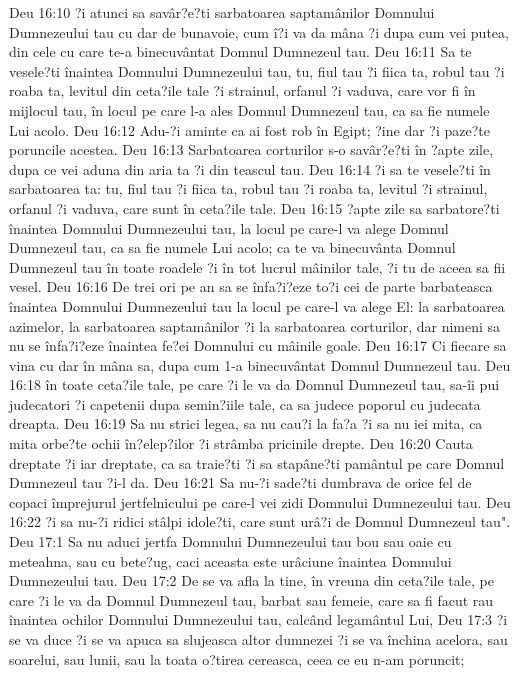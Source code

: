 Deu 16:10  ?i atunci sa savâr?e?ti sarbatoarea saptamânilor Domnului Dumnezeului tau cu dar de bunavoie, cum î?i va da mâna ?i dupa cum vei putea, din cele cu care te-a binecuvântat Domnul Dumnezeul tau.
Deu 16:11  Sa te vesele?ti înaintea Domnului Dumnezeului tau, tu, fiul tau ?i fiica ta, robul tau ?i roaba ta, levitul din ceta?ile tale ?i strainul, orfanul ?i vaduva, care vor fi în mijlocul tau, în locul pe care l-a ales Domnul Dumnezeul tau, ca sa fie numele Lui acolo.
Deu 16:12  Adu-?i aminte ca ai fost rob în Egipt; ?ine dar ?i paze?te poruncile acestea.
Deu 16:13  Sarbatoarea corturilor s-o savâr?e?ti în ?apte zile, dupa ce vei aduna din aria ta ?i din teascul tau.
Deu 16:14  ?i sa te vesele?ti în sarbatoarea ta: tu, fiul tau ?i fiica ta, robul tau ?i roaba ta, levitul ?i strainul, orfanul ?i vaduva, care sunt în ceta?ile tale.
Deu 16:15  ?apte zile sa sarbatore?ti înaintea Domnului Dumnezeului tau, la locul pe care-l va alege Domnul Dumnezeul tau, ca sa fie numele Lui acolo; ca te va binecuvânta Domnul Dumnezeul tau în toate roadele ?i în tot lucrul mâinilor tale, ?i tu de aceea sa fii vesel.
Deu 16:16  De trei ori pe an sa se înfa?i?eze to?i cei de parte barbateasca înaintea Domnului Dumnezeului tau la locul pe care-l va alege El: la sarbatoarea azimelor, la sarbatoarea saptamânilor ?i la sarbatoarea corturilor, dar nimeni sa nu se înfa?i?eze înaintea fe?ei Domnului cu mâinile goale.
Deu 16:17  Ci fiecare sa vina cu dar în mâna sa, dupa cum 1-a binecuvântat Domnul Dumnezeul tau.
Deu 16:18  în toate ceta?ile tale, pe care ?i le va da Domnul Dumnezeul tau, sa-îi pui judecatori ?i capetenii dupa semin?iile tale, ca sa judece poporul cu judecata dreapta.
Deu 16:19  Sa nu strici legea, sa nu cau?i la fa?a ?i sa nu iei mita, ca mita orbe?te ochii în?elep?ilor ?i strâmba pricinile drepte.
Deu 16:20  Cauta dreptate ?i iar dreptate, ca sa traie?ti ?i sa stapâne?ti pamântul pe care Domnul Dumnezeul tau ?i-l da.
Deu 16:21  Sa nu-?i sade?ti dumbrava de orice fel de copaci împrejurul jertfelnicului pe care-l vei zidi Domnului Dumnezeului tau.
Deu 16:22  ?i sa nu-?i ridici stâlpi idole?ti, care sunt urâ?i de Domnul Dumnezeul tau".
Deu 17:1  Sa nu aduci jertfa Domnului Dumnezeului tau bou sau oaie cu meteahna, sau cu bete?ug, caci aceasta este urâciune înaintea Domnului Dumnezeului tau.
Deu 17:2  De se va afla la tine, în vreuna din ceta?ile tale, pe care ?i le va da Domnul Dumnezeul tau, barbat sau femeie, care sa fi facut rau înaintea ochilor Domnului Dumnezeului tau, calcând legamântul Lui,
Deu 17:3  ?i se va duce ?i se va apuca sa slujeasca altor dumnezei ?i se va închina acelora, sau soarelui, sau lunii, sau la toata o?tirea cereasca, ceea ce eu n-am poruncit;
